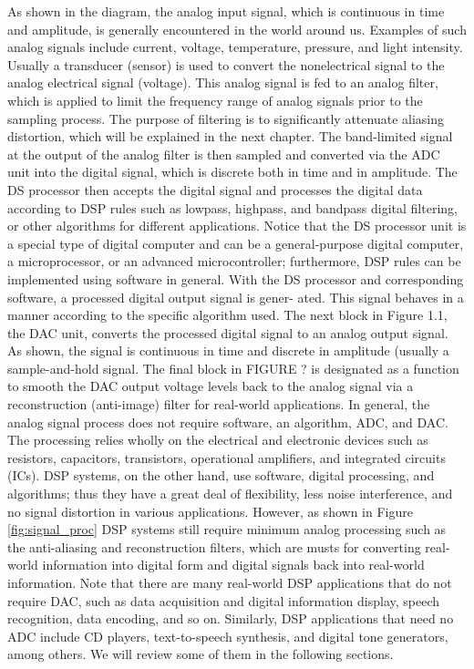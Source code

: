 As shown in the diagram, the analog input signal, which is continuous in time and amplitude, is
generally encountered in the world around us. Examples of such analog signals include current,
voltage, temperature, pressure, and light intensity. Usually a transducer (sensor) is used to
convert the nonelectrical signal to the analog electrical signal (voltage). 
This analog signal is fed to an analog filter, which is applied to limit the frequency range of 
analog signals prior to the sampling process. The purpose of filtering is to significantly
attenuate aliasing distortion, which will be explained in the next chapter.
The band-limited signal at the output of the analog filter is then sampled and converted via the
ADC unit into the digital signal, which is discrete both in time and in amplitude. The DS processor
then accepts the digital signal and processes the digital data according to DSP rules such as 
lowpass, highpass, and bandpass digital filtering, or other algorithms for different applications. 
Notice that the DS processor unit is a special type of digital computer and can be a 
general-purpose digital computer, a microprocessor, or an advanced microcontroller; furthermore, 
DSP rules can be implemented using software in general.
With the DS processor and corresponding software, a processed digital output signal is gener-
ated. This signal behaves in a manner according to the specific algorithm used. The next block in
Figure 1.1, the DAC unit, converts the processed digital signal to an analog output signal. 
As shown, the signal is continuous in time and discrete in amplitude (usually a sample-and-hold 
signal. The final block in FIGURE ? is designated as a function to smooth the DAC
output voltage levels back to the analog signal via a reconstruction (anti-image) filter for 
real-world applications.
In general, the analog signal process does not require software, an algorithm, ADC, and DAC. The
processing relies wholly on the electrical and electronic devices such as resistors, capacitors,
transistors, operational amplifiers, and integrated circuits (ICs).
DSP systems, on the other hand, use software, digital processing, and algorithms; thus they have
a great deal of flexibility, less noise interference, and no signal distortion in various
applications.
However, as shown in Figure \ref{fig:signal_proc} DSP systems still require minimum analog processing such as the
anti-aliasing and reconstruction filters, which are musts for converting real-world 
information into digital form and digital signals back into real-world information.
Note that there are many real-world DSP applications that do not require DAC, such as data
acquisition and digital information display, speech recognition, data encoding, and so on.
Similarly, DSP applications that need no ADC include CD players, text-to-speech synthesis,
and digital tone generators, among others. We will review some of them in the following sections.

